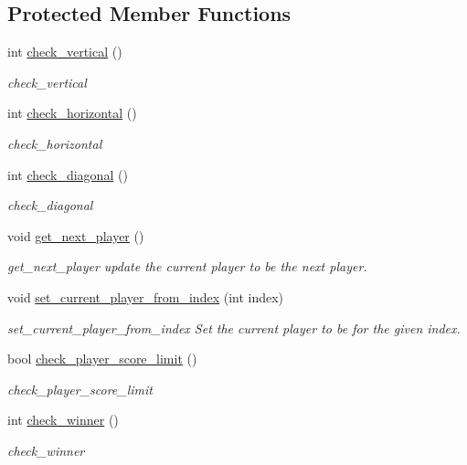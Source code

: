 \subsection*{Protected Member Functions}
\begin{DoxyCompactItemize}
\item 
int \hyperlink{class_tic_tac_toe_game_manager_a25e9e556bf6f7324f4e7ef813778ecd0}{check\+\_\+vertical} ()
\begin{DoxyCompactList}\small\item\em check\+\_\+vertical \end{DoxyCompactList}\item 
int \hyperlink{class_tic_tac_toe_game_manager_af5045a121fc7c8f66bf8977ca2efb7b7}{check\+\_\+horizontal} ()
\begin{DoxyCompactList}\small\item\em check\+\_\+horizontal \end{DoxyCompactList}\item 
int \hyperlink{class_tic_tac_toe_game_manager_a7baa9e6ba971b930f8ace61cc42f034f}{check\+\_\+diagonal} ()
\begin{DoxyCompactList}\small\item\em check\+\_\+diagonal \end{DoxyCompactList}\item 
\mbox{\label{class_tic_tac_toe_game_manager_a98277cf9aec99da101d1e81aece4ae5b}} 
void \hyperlink{class_tic_tac_toe_game_manager_a98277cf9aec99da101d1e81aece4ae5b}{get\+\_\+next\+\_\+player} ()
\begin{DoxyCompactList}\small\item\em get\+\_\+next\+\_\+player update the current player to be the next player. \end{DoxyCompactList}\item 
void \hyperlink{class_tic_tac_toe_game_manager_af97e0687582ed937fd01c603e82c2b5e}{set\+\_\+current\+\_\+player\+\_\+from\+\_\+index} (int index)
\begin{DoxyCompactList}\small\item\em set\+\_\+current\+\_\+player\+\_\+from\+\_\+index Set the current player to be for the given index. \end{DoxyCompactList}\item 
bool \hyperlink{class_tic_tac_toe_game_manager_aeac0a0f9d52ecf828f0827a2069e36ca}{check\+\_\+player\+\_\+score\+\_\+limit} ()
\begin{DoxyCompactList}\small\item\em check\+\_\+player\+\_\+score\+\_\+limit \end{DoxyCompactList}\item 
int \hyperlink{class_tic_tac_toe_game_manager_a6e619b1a463a7165949d34ce5d4ce1a7}{check\+\_\+winner} ()
\begin{DoxyCompactList}\small\item\em check\+\_\+winner \end{DoxyCompactList}\end{DoxyCompactItemize}
